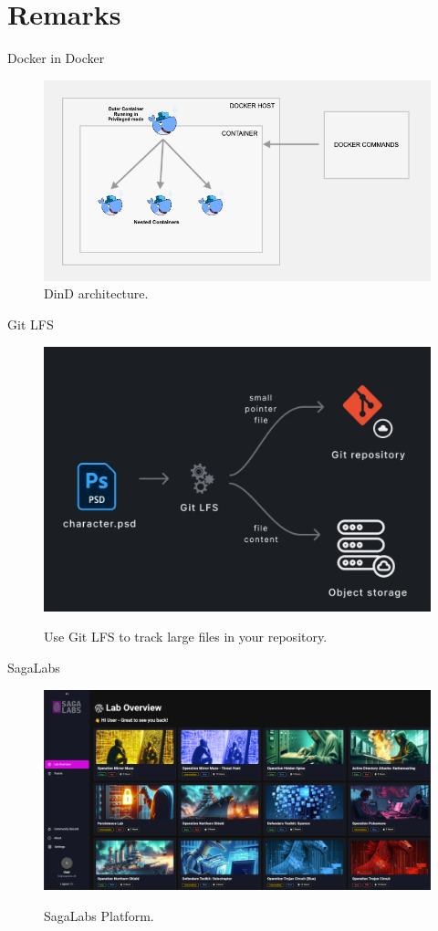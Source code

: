 \documentclass{beamer}
\begin{document}
\section{Remarks}
\begin{frame}{Docker in Docker}
    \begin{figure}
        \centering
        \includegraphics[width=.9\textwidth]{./images/docker-dind.png}
        \caption{DinD architecture.}
    \end{figure}
\end{frame}

\begin{frame}{Git LFS}
    \begin{figure}
        \centering
        \href{https://git-lfs.com/}{%
            \includegraphics[width=.9\textwidth]{./images/Git-LFS.png}
        }
        \caption{Use Git LFS to track large files in your repository.}
    \end{figure}
\end{frame}

\begin{frame}{SagaLabs}
    \begin{figure}
        \centering
        \href{https://sagalabs.dk/}{%
            \includegraphics[width=1\textwidth]{./images/SagaLabs.png}
        }
        \caption{SagaLabs Platform.}
    \end{figure}
\end{frame}
\end{document}
